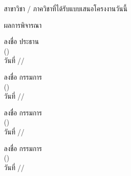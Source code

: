 \documentclass[12pt,a4paper]{article}
\newcommand{\textlight}[1]{{\thailightfont #1}}
\newcommand{\dotrule}[1]{\hdashrule{#1}{0.6pt}{1pt}}
\begin{document}
\vspace{13cm}

\textlight{สาขาวิชา / ภาควิชาที่ได้รับแบบเสนอโครงงานวันนี้ \dotrule{260pt}}

\textlight{ผลการพิจารณา}
\dotrule{422pt}

\dotrule{500pt}

\dotrule{500pt}

\vspace{2cm}

\hfill\begin{minipage}{8cm}
    \vspace{0.5cm}
    \begin{center}
        \textlight{ลงชื่อ \dotrule{150pt} ประธาน}\\[0.2cm]
        \textlight{(\dotrule{180pt})}\\[0.4cm]
        \textlight{วันที่ \dotrule{50pt}/\dotrule{50pt}/\dotrule{50pt}}
    \end{center}
    \vspace{0.5cm}
\end{minipage}  

\hfill\begin{minipage}{8cm}
    \vspace{0.5cm}
    \begin{center}
        \textlight{ลงชื่อ \dotrule{150pt} กรรมการ}\\[0.2cm]
        \textlight{(\dotrule{180pt})}\\[0.4cm]
        \textlight{วันที่ \dotrule{50pt}/\dotrule{50pt}/\dotrule{50pt}}
    \end{center}
    \vspace{0.5cm}
\end{minipage}

\hfill\begin{minipage}{8cm}
    \vspace{0.5cm}
    \begin{center}
        \textlight{ลงชื่อ \dotrule{150pt} กรรมการ}\\[0.2cm]
        \textlight{(\dotrule{180pt})}\\[0.4cm]
        \textlight{วันที่ \dotrule{50pt}/\dotrule{50pt}/\dotrule{50pt}}
    \end{center}
    \vspace{0.5cm}
\end{minipage}

\hfill\begin{minipage}{8cm}
    \vspace{0.5cm}
    \begin{center}
        \textlight{ลงชื่อ \dotrule{150pt} กรรมการ}\\[0.2cm]
        \textlight{(\dotrule{180pt})}\\[0.4cm]
        \textlight{วันที่ \dotrule{50pt}/\dotrule{50pt}/\dotrule{50pt}}
    \end{center}
    \vspace{0.5cm}
\end{minipage}
\end{document}
